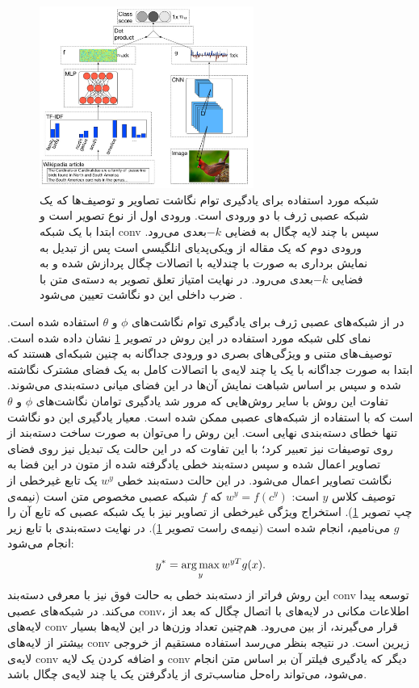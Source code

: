 \begin{figure}[th] 
\begin{center}
\includegraphics[width=7cm]{images/ba.jpg}
\end{center}
\caption[نمای کلی روش ارائه شده در \cite{ba2015}]{
 شبکه مورد استفاده برای یادگیری توام نگاشت تصاویر و توصیف‌ها که یک شبکه عصبی ژرف با دو ورودی است. ورودی اول از نوع تصویر است و ابتدا با یک شبکه \gls{conv} سپس با چند لایه چگال به فضایی $-k$بعدی می‌رود. ورودی دوم که یک مقاله از ویکی‌پدیای انلگیسی است پس از تبدیل به نمایش برداری به صورت  با چندلایه با اتصالات چگال پردازش شده و به فضایی $-k$بعدی می‌رود. در نهایت امتیاز تعلق تصویر به دسته‌ی متن با ضرب داخلی این دو نگاشت تعیین می‌شود \cite{ba2015}.
}
\label{fig:deep}
\end{figure}

در  \cite{ba2015} از شبکه‌های عصبی ژرف برای یادگیری توام نگاشت‌های $\phi$ و $\theta$ استفاده شده است. نمای کلی شبکه مورد استفاده در این روش در تصویر
\ref{fig:deep}
نشان داده شده است. توصیف‌های متنی و ويژگی‌های بصری دو ورودی جداگانه به چنین شبکه‌ای هستند که ابتدا به صورت جداگانه با یک یا چند لایه‌ی با اتصالات کامل به یک فضای مشترک نگاشته شده و سپس بر اساس شباهت نمایش آن‌ها در این فضای میانی دسته‌بندی می‌شوند. تفاوت این روش با سایر روش‌هایی که مرور شد یادگیری توامان نگاشت‌های  $\phi$ و $\theta$ است که با استفاده از شبکه‌های عصبی ممکن شده است. معیار یادگیری این دو نگاشت تنها خطای دسته‌بندی نهایی است.
این روش را می‌توان به صورت ساخت دسته‌بند از روی توصیفات نیز تعبیر کرد؛ با این تفاوت که در این حالت یک تبدیل نیز روی فضای تصاویر اعمال شده و سپس دسته‌بند خطی یادگرفته شده از متون در این فضا به نگاشت تصاویر اعمال می‌شود. در این حالت دسته‌بند خطی $w^y$ یک تابع غیرخطی از توصیف کلاس $y$ است: $w^y = f(c^y)$ که $f$ شبکه عصبی مخصوص متن است (نیمه‌ی چپ تصویر \ref{fig:deep}). استخراج ویژگی غیرخطی از تصاویر نیز با یک شبکه عصبی که تابع آن را $g$ می‌نامیم، انجام شده است (نیمه‌ی راست تصویر \ref{fig:deep}). در نهایت دسته‌بندی با تابع زیر انجام می‌شود:
\begin{equation} \label{eq:ba_classifier}
y^* = \operatorname*{arg\,max}_y{w^{yT} g(x)}.
\end{equation}
این روش فراتر از دسته‌بند خطی به حالت فوق نیز با معرفی دسته‌بند \gls{conv} توسعه پیدا می‌کند. در شبکه‌های عصبی \gls{conv}، اطلاعات مکانی در  لایه‌های با اتصال چگال که بعد از لایه‌های \gls{conv} قرار می‌گیرند، از بین می‌رود. هم‌چنین تعداد وزن‌ها در این لایه‌ها بسیار بیشتر از لایه‌های \gls{conv} زیرین است. در نتیجه بنظر می‌رسد استفاده مستقیم از خروجی لایه‌ی \gls{conv} و اضافه کردن یک لایه \gls{conv} دیگر که یادگیری فیلتر آن بر اساس متن انجام می‌شود، می‌تواند راه‌حل مناسب‌تری از یادگرفتن یک یا چند لایه‌ی چگال باشد.

